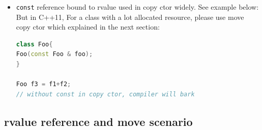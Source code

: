 \documentclass[a4paper,12pt,twoside]{book}
\begin{document}
\begin{itemize}
\item \texttt{const} reference bound to rvalue used in copy ctor widely. See example below: But in C++11, For a class with a lot allocated resource, please use move copy ctor which explained in the next section:

\begin{lstlisting}[frame=single, language=c++]
class Foo{
Foo(const Foo & foo);
}

Foo f3 = f1+f2;
// without const in copy ctor, compiler will bark
\end{lstlisting}
\end{itemize}

\subsection{rvalue reference and move scenario}
\end{document}
